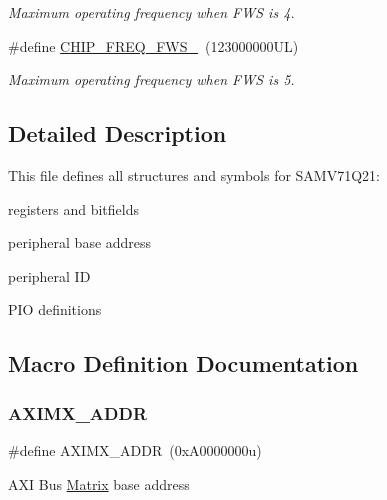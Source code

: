 \begin{DoxyCompactItemize}
\begin{DoxyCompactList}\small\item\em Maximum operating frequency when F\+WS is 4. \end{DoxyCompactList}\item 
\mbox{\label{group__SAMV71Q21__definitions_ga3b66824f858591135877b369f98d48a5}} 
\#define \mbox{\hyperlink{group__SAMV71Q21__definitions_ga3b66824f858591135877b369f98d48a5}{C\+H\+I\+P\+\_\+\+F\+R\+E\+Q\+\_\+\+F\+W\+S\+\_}}~(123000000\+U\+L)
\begin{DoxyCompactList}\small\item\em Maximum operating frequency when F\+WS is 5. \end{DoxyCompactList}\end{DoxyCompactItemize}


\subsection{Detailed Description}
This file defines all structures and symbols for S\+A\+M\+V71\+Q21\+:
\begin{DoxyItemize}
\item registers and bitfields
\item peripheral base address
\item peripheral ID
\item P\+IO definitions 
\end{DoxyItemize}

\subsection{Macro Definition Documentation}
\mbox{\label{group__SAMV71Q21__definitions_ga2fb7cc681bf5e7fbce5e3635b72a330a}} 
\subsubsection{\texorpdfstring{AXIMX\_ADDR}{AXIMX\_ADDR}}
{\footnotesize\ttfamily \#define A\+X\+I\+M\+X\+\_\+\+A\+D\+DR~(0x\+A0000000u)}

A\+XI Bus \mbox{\hyperlink{structMatrix}{Matrix}} base address \mbox{\label{group__SAMV71Q21__definitions_ga26626a425f7ebb3a0c2dbc276f0d9f78}} 
